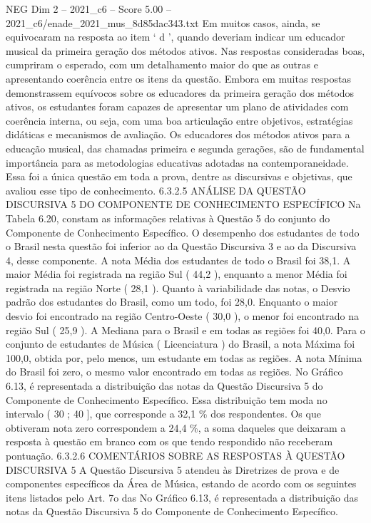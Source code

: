 \begin{textsample}{NEG Dim 2 – 2021\_c6 – Score 5.00 – 2021\_c6/enade\_2021\_mus\_8d85dac343.txt}
Em muitos casos, ainda, se equivocaram na resposta ao item ‘ d ’, quando deveriam indicar um educador musical da primeira geração dos métodos ativos.
Nas respostas consideradas boas, cumpriram o esperado, com um detalhamento maior do que as outras e apresentando coerência entre os itens da questão.
Embora em muitas respostas demonstrassem equívocos sobre os educadores da primeira geração dos métodos ativos, os estudantes foram capazes de apresentar um plano de atividades com coerência interna, ou seja, com uma boa articulação entre objetivos, estratégias didáticas e mecanismos de avaliação.
Os educadores dos métodos ativos para a educação musical, das chamadas primeira e segunda gerações, são de fundamental importância para as metodologias educativas adotadas na contemporaneidade.
Essa foi a única questão em toda a prova, dentre as discursivas e objetivas, que avaliou esse tipo de conhecimento. 6.3.2.5 ANÁLISE DA QUESTÃO DISCURSIVA 5 DO COMPONENTE DE CONHECIMENTO ESPECÍFICO Na Tabela 6.20, constam as informações relativas à Questão 5 do conjunto do Componente de Conhecimento Específico.
O desempenho dos estudantes de todo o Brasil nesta questão foi inferior ao da Questão Discursiva 3 e ao da Discursiva 4, desse componente.
A nota Média dos estudantes de todo o Brasil foi 38,1.
A maior Média foi registrada na região Sul ( 44,2 ), enquanto a menor Média foi registrada na região Norte ( 28,1 ).
Quanto à variabilidade das notas, o Desvio padrão dos estudantes do Brasil, como um todo, foi 28,0.
Enquanto o maior desvio foi encontrado na região Centro-Oeste ( 30,0 ), o menor foi encontrado na região Sul ( 25,9 ).
A Mediana para o Brasil e em todas as regiões foi 40,0.
Para o conjunto de estudantes de Música ( Licenciatura ) do Brasil, a nota Máxima foi 100,0, obtida por, pelo menos, um estudante em todas as regiões.
A nota Mínima do Brasil foi zero, o mesmo valor encontrado em todas as regiões.
No Gráfico 6.13, é representada a distribuição das notas da Questão Discursiva 5 do Componente de Conhecimento Específico.
Essa distribuição tem moda no intervalo ( 30 ; 40 ], que corresponde a 32,1 \% dos respondentes.
Os que obtiveram nota zero correspondem a 24,4 \%, a soma daqueles que deixaram a resposta à questão em branco com os que tendo respondido não receberam pontuação. 6.3.2.6 COMENTÁRIOS SOBRE AS RESPOSTAS À QUESTÃO DISCURSIVA 5 A Questão Discursiva 5 atendeu às Diretrizes de prova e de componentes específicos da Área de Música, estando de acordo com os seguintes itens listados pelo Art. 7o das No Gráfico 6.13, é representada a distribuição das notas da Questão Discursiva 5 do Componente de Conhecimento Específico.

\end{textsample}
